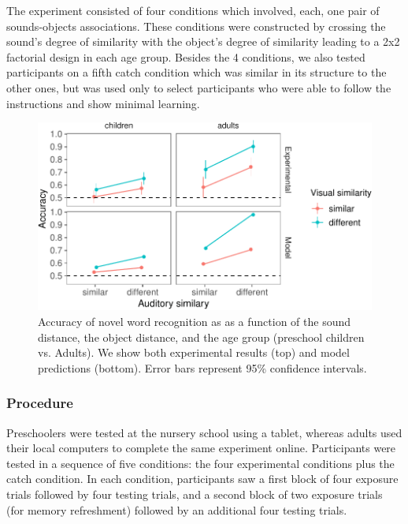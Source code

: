 \documentclass[10pt, letterpaper]{article}
\newenvironment{CodeChunk}{}{}
\begin{document}
The experiment consisted of four conditions which involved, each, one
pair of sounds-objects associations. These conditions were constructed
by crossing the sound's degree of similarity with the object's degree of
similarity leading to a 2x2 factorial design in each age group. Besides
the 4 conditions, we also tested participants on a fifth catch condition
which was similar in its structure to the other ones, but was used only
to select participants who were able to follow the instructions and show
minimal learning.

\begin{CodeChunk}
\begin{figure}[h]

{\centering \includegraphics{figs/all_data-1} 

}

\caption{\label{fig:data_all}Accuracy of novel word recognition as as a function of the sound distance, the object distance, and the age group (preschool children vs. Adults). We show both experimental results (top) and model predictions (bottom). Error bars represent 95\% confidence intervals.}\label{fig:all_data}
\end{figure}
\end{CodeChunk}

\subsubsection{Procedure}\label{procedure}

Preschoolers were tested at the nursery school using a tablet, whereas
adults used their local computers to complete the same experiment
online. Participants were tested in a sequence of five conditions: the
four experimental conditions plus the catch condition. In each
condition, participants saw a first block of four exposure trials
followed by four testing trials, and a second block of two exposure
trials (for memory refreshment) followed by an additional four testing
trials.
\end{document}
